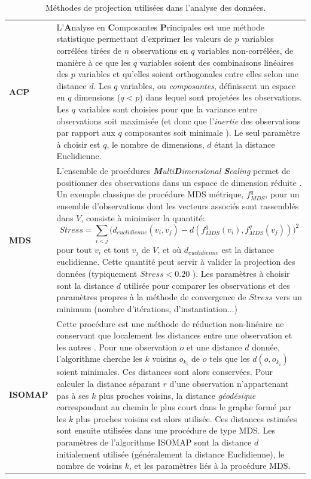       \begin{longtable}{ @{\hspace{-2.2cm}} >{\bfseries}p{}|>{\small}p{} }
      \caption[Méthodes de projection utilisées]{Méthodes de projection utilisées dans l'analyse des données.}\\ \label{tabprojec}
      \textbf{ACP} & L'\textbf{A}nalyse en \textbf{C}omposantes \textbf{P}rincipales \citep{hotelling1933analysis} est une méthode statistique permettant d'exprimer les valeurs de $p$ variables corrélées tirées de $n$ observations en $q$ variables non-corrélées, de manière à ce que les $q$ variables soient des combinaisons linéaires des $p$ variables et qu'elles soient orthogonales entre elles selon une distance $d$. Les $q$ variables, ou \textit{composantes}, définissent un espace en $q$ dimensions ($q < p$) dans lequel sont projetées les observations. Les $q$ variables sont choisies pour que la variance entre observations soit maximisée (et donc que l'\textit{inertie} des observations par rapport aux $q$ composantes soit minimale \citep{duby2006analyse}). Le seul paramètre à choisir est  $q$, le nombre de dimensions, $d$ étant la distance Euclidienne.
\\[0.4cm]
      \textbf{MDS} & L'ensemble de procédures \textit{\textbf{M}ulti\textbf{D}imensional \textbf{S}caling} permet de positionner des observations dans un espace de dimension réduite \citep{izenman2008modern}. Un exemple classique de procédure MDS métrique, $f_{MDS}^{q}$, pour un ensemble d'observations dont les vecteurs associés sont rassemblés dans $V$, consiste à minimiser la quantité: 
      \begin{equation} 
      Stress=\sum_{i<j}  \Big(d_{euclidienne}(v_{i},v_{j}) - d(f_{MDS}^{q}(v_{i}),f_{MDS}^{q}(v_{j}))\Big)^{2}
      \end{equation}
      pour tout $v_{i}$ et tout $v_{j}$ de $V$, et où $d_{euclidienne}$ est la distance euclidienne. Cette quantité peut servir à valider la projection des données (typiquement $Stress<0.20$ \citep{izenman2008modern}). Les paramètres à choisir sont la distance $d$ utilisée pour comparer les observations et des paramètres propres à la méthode de convergence de $Stress$ vers un minimum (nombre d'itérations, d'instantiation...)
\\[0.4cm]
     \textbf{ISOMAP} & Cette procédure est une méthode de réduction non-linéaire ne conservant que localement les distances entre une observation et les autres \citep{tenenbaum1998mapping,tenenbaum2000global}. Pour une observation $o$ et une distance $d$ donnée, l'algorithme cherche les $k$ voisins $o_{k_{i}}$ de $o$ tels que les $d(o,o_{k_{i}})$ soient minimales. Ces distances sont alors conservées. Pour calculer la distance séparant $r$ d'une observation n'appartenant pas à ses $k$ plus proches voisins, la distance \textit{géodésique} correspondant au chemin le plus court dans le graphe formé par les $k$ plus proches voisins est alors utilisée. Ces distances estimées sont ensuite utilisées dans une procédure de type MDS. Les paramètres de l'algorithme ISOMAP sont la distance $d$ initialement utilisée (généralement la distance Euclidienne), le nombre de voisins $k$, et les paramètres liés à la procédure MDS.

\end{longtable}
